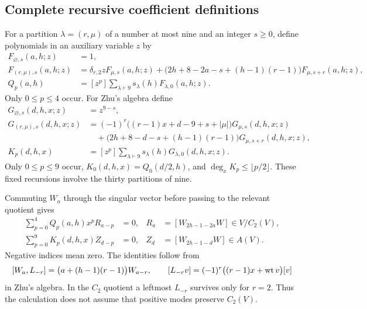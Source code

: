 \documentclass[11pt]{article}
\numberwithin{equation}{section}
\begin{document}
\subsection{Complete recursive coefficient definitions}
For a partition $\lambda=(r,\mu)$ of a number at most nine and an integer $s\geq0$, define polynomials in an auxiliary variable $z$ by
\begin{align*}
F_{\varnothing,s}(a,h;z)&=1,\\
F_{(r,\mu),s}(a,h;z)&=\delta_{r,2}zF_{\mu,s}(a,h;z)
+\bigl(2h+8-2a-s+(h-1)(r-1)\bigr)F_{\mu,s+r}(a,h;z),\\
Q_p(a,h)&=[z^p]\sum_{\lambda\vdash9}s_\lambda(h)F_{\lambda,0}(a,h;z).
\end{align*}
Only $0\leq p\leq4$ occur. For Zhu's algebra define
\begin{align*}
G_{\varnothing,s}(d,h,x;z)&=z^{9-s},\\
G_{(r,\mu),s}(d,h,x;z)&=(-1)^r\bigl((r-1)x+d-9+s+|\mu|\bigr)G_{\mu,s}(d,h,x;z)\\
&\quad+\bigl(2h+8-d-s+(h-1)(r-1)\bigr)G_{\mu,s+r}(d,h,x;z),\\
K_p(d,h,x)&=[z^p]\sum_{\lambda\vdash9}s_\lambda(h)G_{\lambda,0}(d,h,x;z).
\end{align*}
Only $0\leq p\leq9$ occur, $K_0(d,h,x)=Q_0(d/2,h)$, and $\deg_xK_p\leq\lfloor p/2\rfloor$. These fixed recursions involve the thirty partitions of nine.

Commuting $W_a$ through the singular vector before passing to the relevant quotient gives
\begin{align}
\sum_{p=0}^4Q_p(a,h)x^pR_{a-p}&=0,
&R_a&=[W_{2h-1-2a}W]\in V/C_2(V),\label{H:C2rec}\\
\sum_{p=0}^9K_p(d,h,x)Z_{d-p}&=0,
&Z_d&=[W_{2h-1-d}W]\in A(V).\label{H:Zhurec}
\end{align}
Negative indices mean zero. The identities follow from
\[
[W_a,L_{-r}]=\bigl(a+(h-1)(r-1)\bigr)W_{a-r},\qquad
[L_{-r}v]=(-1)^r\bigl((r-1)x+\operatorname{wt} v\bigr)[v]
\]
in Zhu's algebra. In the $C_2$ quotient a leftmost $L_{-r}$ survives only for $r=2$. Thus the calculation does not assume that positive modes preserve $C_2(V)$.
\end{document}
